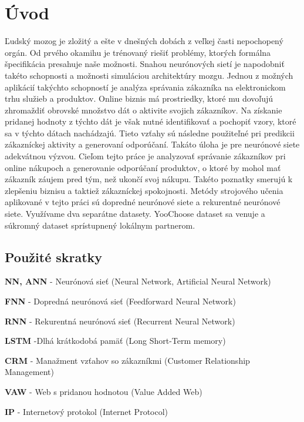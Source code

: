 \newpage
\chapter{Úvod}

Ľudský mozog je zložitý a ešte v dnešných dobách z veľkej časti nepochopený orgán. Od prvého okamihu je trénovaný riešiť problémy, ktorých formálna špecifikácia presahuje naše možnosti. Snahou neurónových sietí je napodobniť takéto schopnosti a možnosti simuláciou architektúry mozgu. \newline
Jednou z možných aplikácií takýchto schopností je analýza správania zákazníka na elektronickom trhu služieb a produktov. Online biznis má prostriedky, ktoré mu dovoľujú zhromaždiť obrovské množstvo dát o aktivite svojich zákazníkov. Na získanie pridanej hodnoty z týchto dát je však nutné identifikovať a pochopiť vzory, ktoré sa v týchto dátach nachádzajú. Tieto vzťahy sú následne použiteľné pri predikcii zákazníckej aktivity a generovaní odporúčaní. Takáto úloha je pre neurónové siete adekvátnou výzvou.
\newline
Cieľom tejto práce je analyzovať správanie zákazníkov pri online nákupoch a generovanie odporúčaní produktov, o ktoré by mohol mať zákazník záujem pred tým, než ukončí svoj nákupu. Takéto poznatky smerujú k zlepšeniu biznisu a taktiež zákazníckej spokojnosti. Metódy strojového učenia aplikované v tejto práci sú dopredné neurónové siete a rekurentné neurónové siete. Využívame dva separátne datasety. YooChoose dataset sa venuje  a súkromný dataset sprístupnený lokálnym partnerom.
\newpage

\section{Použité skratky}
\label{uvod_pouzite_skratky}

\begin{my_itemize}
\item \textbf{NN, ANN} - Neurónová sieť (Neural Network, Artificial Neural Network)
\item \textbf{FNN} - Dopredná neurónová sieť (Feedforward Neural Network)
\item \textbf{RNN} - Rekurentná neurónová sieť (Recurrent Neural Network)
\item \textbf{LSTM} -Dlhá krátkodobá pamäť (Long Short-Term memory)
\item \textbf{CRM} - Manažment vzťahov so zákazníkmi (Customer Relationship Management)
\item \textbf{VAW} - Web s pridanou hodnotou (Value Added Web)
\item \textbf{IP} - Internetový protokol (Internet Protocol)
\end{my_itemize}
